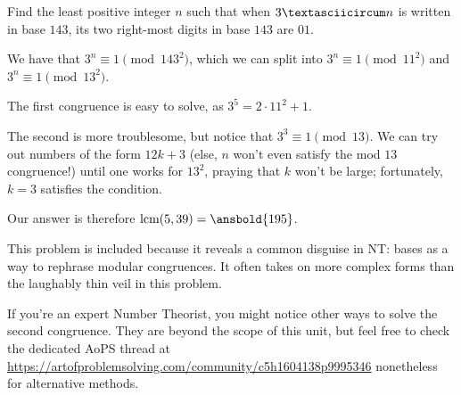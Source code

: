 \documentclass[mast]{lucky}
\begin{document}
\begin{exam}[AIME I 2018/11]
Find the least positive integer $n$ such that when $3\textasciicircum n$ is
written in base $143$, its two right-most digits in base $143$ are $01$.
\end{exam}
\begin{sol}
We have that $3^n\equiv 1\pmod{143^2}$, which we can split into $3^n\equiv 1\pmod{11^2}$ and $3^n\equiv 1\pmod{13^2}$.

The first congruence is easy to solve, as $3^5=2\cdot 11^2+1$.

The second is more troublesome, but notice that $3^3\equiv 1\pmod 13$. We can try out numbers of the form $12k+3$ (else, $n$ won't even satisfy the mod $13$ congruence!) until one works for $13^2$, praying that $k$ won't be large; fortunately, $k=3$ satisfies the condition.

Our answer is therefore $\text{lcm}(5,39)=\ansbold{195}$.
\end{sol}
\begin{remark}
This problem is included because it reveals a common disguise in NT: bases as a way to rephrase modular congruences. It often takes on more complex forms than the laughably thin veil in this problem.

If you're an expert Number Theorist, you might notice other ways to solve the second congruence. They are beyond the scope of this unit, but feel free to check the dedicated AoPS thread at \url{https://artofproblemsolving.com/community/c5h1604138p9995346} nonetheless for alternative methods.
\end{remark}
\end{document}
